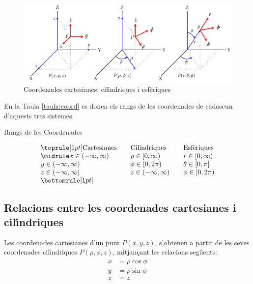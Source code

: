 \documentclass[catalan,a4paper,twoside,11pt]{article}
\begin{document}
\begin{figure}[h]
\centering
   \includegraphics{Imatges/Coordenades.pdf}
\caption{Coordenades cartesianes, cil\'{\i}ndriques i esf\`{e}riques}
\label{pic:coord-cart-cil-esf}
\end{figure}

En la Taula \vref{taula:coord} es donen els rangs de les coordenades de cadascun d'aquests tres sistemes.
\begin{table}[htb]
   \caption{\label{taula:coord}Rangs de les Coordenades}
   \[ \begin{array}{lllll}
   \toprule[1pt]
   \text{Cartesianes} &  & \text{Cil\'{\i}ndriques} & & \text{Esf\`{e}riques}
   \\
   \midrule
      x\in(-\infty,\infty) &   & \rho\in[0,\infty)    &  &  r\in[0,\infty)  \\
      y\in(-\infty,\infty) &   & \phi\in[0,2\pi)   &  &  \theta\in[0,\pi] \\
      z\in(-\infty,\infty) &   & z\in(-\infty,\infty) &  &  \phi\in[0,2\pi) \\
   \bottomrule[1pt]
   \end{array}   \]
\end{table}

\subsection{Relacions entre les coordenades cartesianes i
cil\'{\i}ndriques}

Les coordenades cartesianes  d'un punt $P(x,y,z)$, s'obtenen a partir
de les seves coordenades cil\'{\i}ndriques $P(\rho,\phi,z)$,
mitjan\c{c}ant les relacions seg\"{u}ents:
\begin{subequations}\begin{align}
    x &=\rho\cos\phi \\ y &=\rho\sin\phi \\ z &=z
\end{align}\end{subequations}
\end{document}
